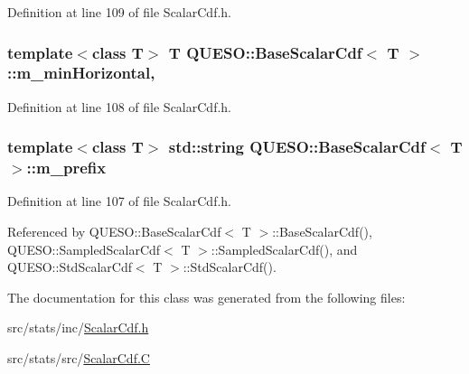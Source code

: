 Definition at line 109 of file Scalar\-Cdf.\-h.

\hypertarget{class_q_u_e_s_o_1_1_base_scalar_cdf_ab54be9623cddb0671db458d05d63f0a7}{
\subsubsection[{m\-\_\-min\-Horizontal}]{\setlength{\rightskip}{0pt plus 5cm}template$<$class T$>$ T {\bf Q\-U\-E\-S\-O\-::\-Base\-Scalar\-Cdf}$<$ T $>$\-::m\-\_\-min\-Horizontal\hspace{0.3cm}{\ttfamily [mutable]}, {\ttfamily [protected]}}}\label{class_q_u_e_s_o_1_1_base_scalar_cdf_ab54be9623cddb0671db458d05d63f0a7}


Definition at line 108 of file Scalar\-Cdf.\-h.

\hypertarget{class_q_u_e_s_o_1_1_base_scalar_cdf_a66c2a1bcf0ac517013e7857c3533a187}{
\subsubsection[{m\-\_\-prefix}]{\setlength{\rightskip}{0pt plus 5cm}template$<$class T$>$ std\-::string {\bf Q\-U\-E\-S\-O\-::\-Base\-Scalar\-Cdf}$<$ T $>$\-::m\-\_\-prefix\hspace{0.3cm}{\ttfamily [protected]}}}\label{class_q_u_e_s_o_1_1_base_scalar_cdf_a66c2a1bcf0ac517013e7857c3533a187}


Definition at line 107 of file Scalar\-Cdf.\-h.



Referenced by Q\-U\-E\-S\-O\-::\-Base\-Scalar\-Cdf$<$ T $>$\-::\-Base\-Scalar\-Cdf(), Q\-U\-E\-S\-O\-::\-Sampled\-Scalar\-Cdf$<$ T $>$\-::\-Sampled\-Scalar\-Cdf(), and Q\-U\-E\-S\-O\-::\-Std\-Scalar\-Cdf$<$ T $>$\-::\-Std\-Scalar\-Cdf().



The documentation for this class was generated from the following files\-:\begin{DoxyCompactItemize}
\item 
src/stats/inc/\hyperlink{_scalar_cdf_8h}{Scalar\-Cdf.\-h}\item 
src/stats/src/\hyperlink{_scalar_cdf_8_c}{Scalar\-Cdf.\-C}\end{DoxyCompactItemize}
